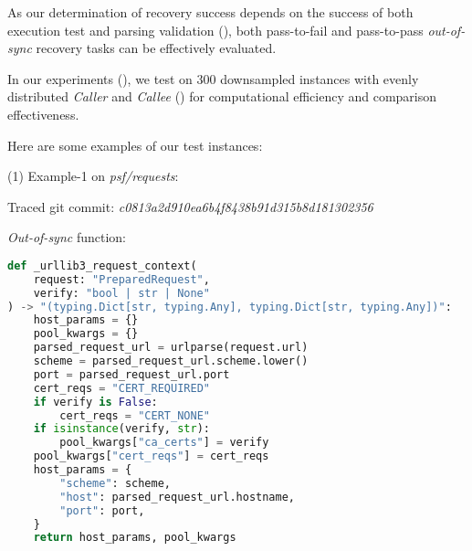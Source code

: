 As our determination of recovery success depends on the success of both execution test and parsing validation (), both {pass-to-fail} and {pass-to-pass} \textit{out-of-sync} recovery tasks can be effectively evaluated.



In our experiments (), we test on 300 downsampled instances with evenly distributed \textit{Caller} and \textit{Callee} () for computational efficiency and comparison effectiveness. 






Here are some examples of our test instances:

(1) Example-1 on \textit{psf/requests}:

Traced git commit: \textit{c0813a2d910ea6b4f8438b91d315b8d181302356}

\textit{Out-of-sync} function:

\begin{lstlisting}[language=Python]
def _urllib3_request_context(
    request: "PreparedRequest", 
    verify: "bool | str | None"
) -> "(typing.Dict[str, typing.Any], typing.Dict[str, typing.Any])":
    host_params = {}
    pool_kwargs = {}
    parsed_request_url = urlparse(request.url)
    scheme = parsed_request_url.scheme.lower()
    port = parsed_request_url.port
    cert_reqs = "CERT_REQUIRED"
    if verify is False:
        cert_reqs = "CERT_NONE"
    if isinstance(verify, str):
        pool_kwargs["ca_certs"] = verify
    pool_kwargs["cert_reqs"] = cert_reqs
    host_params = {
        "scheme": scheme,
        "host": parsed_request_url.hostname,
        "port": port,
    }
    return host_params, pool_kwargs
\end{lstlisting}


